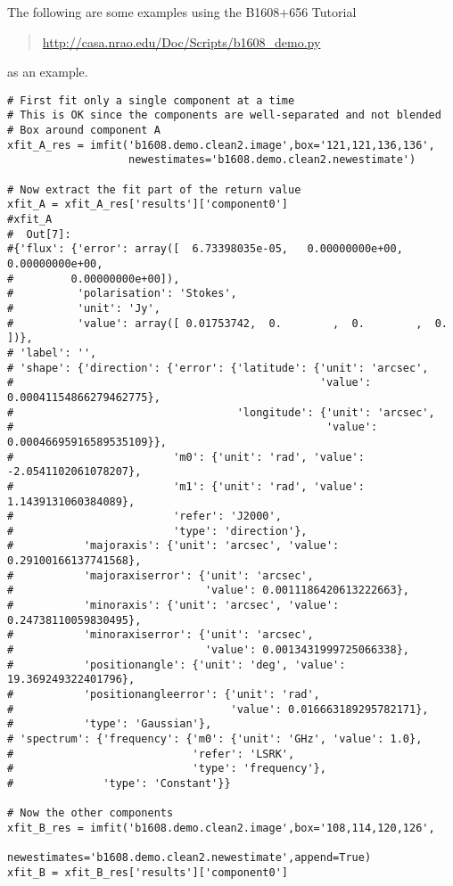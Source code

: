 The following are some examples using the B1608+656 Tutorial
\begin{quote}
  \url{http://casa.nrao.edu/Doc/Scripts/b1608_demo.py}
\end{quote}
as an example.

\small
\begin{verbatim}
# First fit only a single component at a time
# This is OK since the components are well-separated and not blended
# Box around component A
xfit_A_res = imfit('b1608.demo.clean2.image',box='121,121,136,136',
                   newestimates='b1608.demo.clean2.newestimate')

# Now extract the fit part of the return value
xfit_A = xfit_A_res['results']['component0']
#xfit_A
#  Out[7]: 
#{'flux': {'error': array([  6.73398035e-05,   0.00000000e+00,   0.00000000e+00,
#         0.00000000e+00]),
#          'polarisation': 'Stokes',
#          'unit': 'Jy',
#          'value': array([ 0.01753742,  0.        ,  0.        ,  0.        ])},
# 'label': '',
# 'shape': {'direction': {'error': {'latitude': {'unit': 'arcsec',
#                                                'value': 0.00041154866279462775},
#                                   'longitude': {'unit': 'arcsec',
#                                                 'value': 0.00046695916589535109}},
#                         'm0': {'unit': 'rad', 'value': -2.0541102061078207},
#                         'm1': {'unit': 'rad', 'value': 1.1439131060384089},
#                         'refer': 'J2000',
#                         'type': 'direction'},
#           'majoraxis': {'unit': 'arcsec', 'value': 0.29100166137741568},
#           'majoraxiserror': {'unit': 'arcsec',
#                              'value': 0.0011186420613222663},
#           'minoraxis': {'unit': 'arcsec', 'value': 0.24738110059830495},
#           'minoraxiserror': {'unit': 'arcsec',
#                              'value': 0.0013431999725066338},
#           'positionangle': {'unit': 'deg', 'value': 19.369249322401796},
#           'positionangleerror': {'unit': 'rad',
#                                  'value': 0.016663189295782171},
#           'type': 'Gaussian'},
# 'spectrum': {'frequency': {'m0': {'unit': 'GHz', 'value': 1.0},
#                            'refer': 'LSRK',
#                            'type': 'frequency'},
#              'type': 'Constant'}}

# Now the other components
xfit_B_res = imfit('b1608.demo.clean2.image',box='108,114,120,126',
                   newestimates='b1608.demo.clean2.newestimate',append=True)
xfit_B = xfit_B_res['results']['component0']


\end{verbatim}
